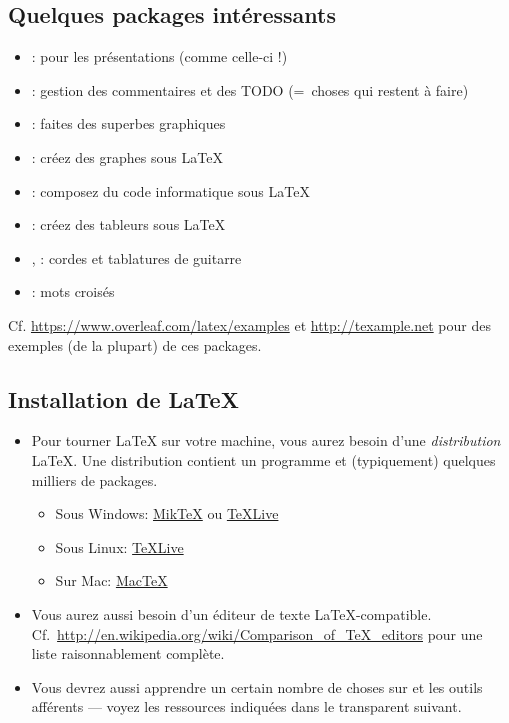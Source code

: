 \documentclass{beamer}
\begin{document}
\subsection{Quelques packages intéressants}
\begin{frame}{\insertsubsection}
\begin{itemize}
\item {}: pour les présentations (comme celle-ci !)
\item {}: gestion des commentaires et des TODO (=~choses qui restent à faire)
\item {}: faites des superbes graphiques
\item {}: créez des graphes sous \LaTeX
\item {}: composez du code informatique sous \LaTeX
\item {}: créez des tableurs sous \LaTeX
\item {}, : cordes et tablatures de guitarre
\item {}: mots croisés
\end{itemize}
Cf. \url{https://www.overleaf.com/latex/examples} et \url{http://texample.net}
pour des exemples (de la plupart) de ces packages.
\end{frame}

\subsection{Installation de \LaTeX{}}
\begin{frame}{\insertsubsection}
\begin{itemize}
\item Pour tourner \LaTeX{} sur votre machine, vous aurez besoin d'une
\emph{distribution} \LaTeX{}. Une distribution contient un programme  et
(typiquement) quelques milliers de packages.
\begin{itemize}
\item Sous Windows: \href{http://miktex.org/}{Mik\TeX} ou \href{http://tug.org/texlive/}{\TeX Live}
\item Sous Linux: \href{http://tug.org/texlive/}{\TeX Live}
\item Sur Mac: \href{http://tug.org/mactex/}{Mac\TeX}
\end{itemize}
\item Vous aurez aussi besoin d'un éditeur de texte \LaTeX{}-compatible. Cf.~\url{http://en.wikipedia.org/wiki/Comparison_of_TeX_editors} pour une liste raisonnablement complète.
\item Vous devrez aussi apprendre un certain nombre de choses sur  et les outils afférents --- voyez les ressources indiquées dans le transparent suivant.
\end{itemize}
\end{frame}
\end{document}
